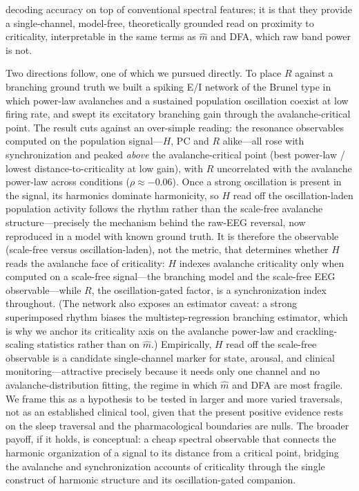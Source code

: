 \documentclass[11pt]{article}
\begin{document}
decoding accuracy on top of conventional spectral features; it is that they provide a single-channel, model-free, theoretically grounded read on proximity to criticality, interpretable in the same terms as $\hat m$ and DFA, which raw band power is not.

Two directions follow, one of which we pursued directly. To place $R$ against a branching ground truth we built a spiking E/I network of the Brunel type in which power-law avalanches and a sustained population oscillation coexist at low firing rate, and swept its excitatory branching gain through the avalanche-critical point. The result cuts against an over-simple reading: the resonance observables computed on the population signal---$H$, $\mathrm{PC}$ and $R$ alike---all rose with synchronization and peaked \emph{above} the avalanche-critical point (best power-law / lowest distance-to-criticality at low gain), with $R$ uncorrelated with the avalanche power-law across conditions ($\rho\approx-0.06$). Once a strong oscillation is present in the signal, its harmonics dominate harmonicity, so $H$ read off the oscillation-laden population activity follows the rhythm rather than the scale-free avalanche structure---precisely the mechanism behind the raw-EEG reversal, now reproduced in a model with known ground truth. It is therefore the observable (scale-free versus oscillation-laden), not the metric, that determines whether $H$ reads the avalanche face of criticality: $H$ indexes avalanche criticality only when computed on a scale-free signal---the branching model and the scale-free EEG observable---while $R$, the oscillation-gated factor, is a synchronization index throughout. (The network also exposes an estimator caveat: a strong superimposed rhythm biases the multistep-regression branching estimator, which is why we anchor its criticality axis on the avalanche power-law and crackling-scaling statistics rather than on $\hat m$.) Empirically, $H$ read off the scale-free observable is a candidate single-channel marker for state, arousal, and clinical monitoring---attractive precisely because it needs only one channel and no avalanche-distribution fitting, the regime in which $\hat m$ and DFA are most fragile. We frame this as a hypothesis to be tested in larger and more varied traversals, not as an established clinical tool, given that the present positive evidence rests on the sleep traversal and the pharmacological boundaries are nulls. The broader payoff, if it holds, is conceptual: a cheap spectral observable that connects the harmonic organization of a signal to its distance from a critical point, bridging the avalanche and synchronization accounts of criticality through the single construct of harmonic structure and its oscillation-gated companion.
\end{document}
